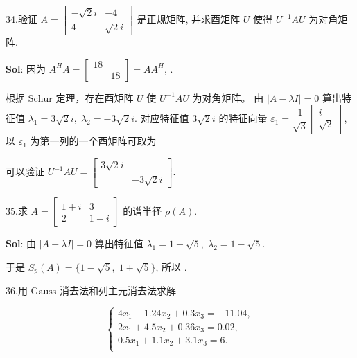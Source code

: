 
34.验证 $A=\begin{bmatrix}
    -\sqrt{2}i&-4\\
    4&\sqrt{2}i
\end{bmatrix}$ 是正规矩阵, 并求酉矩阵 $U$ 使得 $U^{-1}AU$ 为对角矩阵.


\textbf{Sol}:  因为 $A^HA=\begin{bmatrix}
    18&\\&18
\end{bmatrix}=AA^H$, 
.

根据 $\text{Schur}$ 定理，存在酉矩阵 $U$ 使 $U^{-1}AU$ 为对角矩阵。 由 $|A-\lambda I|=0$ 算出特征值 $\lambda_1=3\sqrt{2}i,\;\lambda_2=-3\sqrt{2}i$. 对应特征值 $3\sqrt{2}i$ 的特征向量 $\varepsilon_1=\dfrac{1}{\sqrt{3}}\begin{bmatrix}
    i\\\sqrt{2}
\end{bmatrix}$, 以 $\varepsilon_1$ 为第一列的一个酉矩阵可取为 

可以验证 $U^{-1}AU=\begin{bmatrix}
    3\sqrt{2}i&\\&-3\sqrt{2}i
\end{bmatrix}$.


\vspace{12pt}

35.求 $A=\begin{bmatrix}
    1+i&3\\
    2&1-i
\end{bmatrix}$ 的谱半径 $\rho(A)$.


\textbf{Sol}: 由 $|A-\lambda I|=0$ 算出特征值 $\lambda_1=1+\sqrt{5},\;\lambda_2=1-\sqrt{5}$. 

于是 $S_p(A)=\{1-\sqrt{5},\;1+\sqrt{5}\}$, 所以 .


\vspace{12pt}

36.用 $\text{Gauss}$ 消去法和列主元消去法求解

$$
\begin{cases}
    4x_1-1.24x_2+0.3x_3=-11.04,\\
    2x_1+4.5x_2+0.36x_3=0.02,\\
    0.5x_1+1.1x_2+3.1x_3=6.\\
\end{cases}
$$


